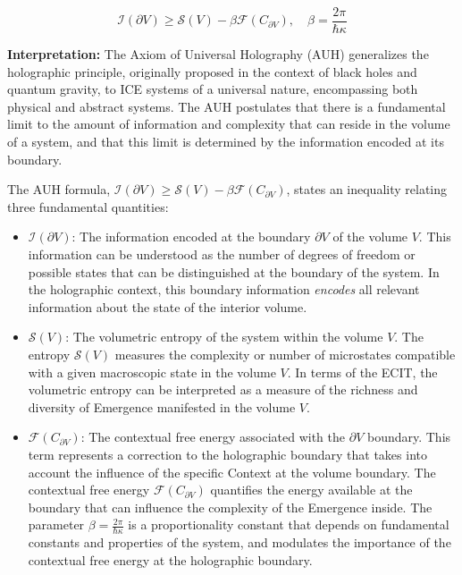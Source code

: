 \documentclass{article}
\begin{document}
\begin{equation}
\mathcal{I}(\partial V) \geq \mathcal{S}(V) - \beta \mathcal{F}(C_{\partial V}),\quad \beta = \frac{2\pi}{\hbar \kappa}
\label{eq:AUH_formula}
\end{equation}
\bigskip

\textbf{Interpretation:} The Axiom of Universal Holography (AUH) generalizes the holographic principle, originally proposed in the context of black holes and quantum gravity, to ICE systems of a universal nature, encompassing both physical and abstract systems. The AUH postulates that there is a fundamental limit to the amount of information and complexity that can reside in the volume of a system, and that this limit is determined by the information encoded at its boundary.

The AUH formula, $\mathcal{I}(\partial V) \geq \mathcal{S}(V) - \beta \mathcal{F}(C_{\partial V})$, states an inequality relating three fundamental quantities:

\begin{itemize}
 \item $\mathcal{I}(\partial V)$: The information encoded at the boundary $\partial V$ of the volume $V$. This information can be understood as the number of degrees of freedom or possible states that can be distinguished at the boundary of the system. In the holographic context, this boundary information \textit{encodes} all relevant information about the state of the interior volume.

\item $\mathcal{S}(V)$: The volumetric entropy of the system within the volume $V$. The entropy $\mathcal{S}(V)$ measures the complexity or number of microstates compatible with a given macroscopic state in the volume $V$. In terms of the ECIT, the volumetric entropy can be interpreted as a measure of the richness and diversity of Emergence manifested in the volume $V$.

\item $\mathcal{F}(C_{\partial V})$: The contextual free energy associated with the $\partial V$ boundary. This term represents a correction to the holographic boundary that takes into account the influence of the specific Context at the volume boundary. The contextual free energy $\mathcal{F}(C_{\partial V})$ quantifies the energy available at the boundary that can influence the complexity of the Emergence inside. The parameter $\beta = \frac{2\pi}{\hbar \kappa}$ is a proportionality constant that depends on fundamental constants and properties of the system, and modulates the importance of the contextual free energy at the holographic boundary.

\end{itemize}
\end{document}

